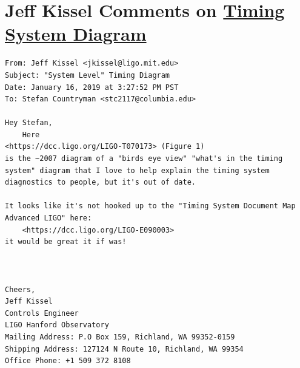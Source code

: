 \documentclass{article}
\begin{document}
\clearpage
\section{Jeff Kissel Comments on \href{https://dcc.ligo.org/LIGO-D1500201}{Timing System Diagram}}
\label{sec:timing-system-diagram-email}
\lstset{language=}
\begin{lstlisting}
From: Jeff Kissel <jkissel@ligo.mit.edu>
Subject: "System Level" Timing Diagram
Date: January 16, 2019 at 3:27:52 PM PST
To: Stefan Countryman <stc2117@columbia.edu>

Hey Stefan,
	Here
<https://dcc.ligo.org/LIGO-T070173> (Figure 1)
is the ~2007 diagram of a "birds eye view" "what's in the timing system" diagram that I love to help explain the timing system diagnostics to people, but it's out of date.

It looks like it's not hooked up to the "Timing System Document Map Advanced LIGO" here:
	<https://dcc.ligo.org/LIGO-E090003>
it would be great it if was!



Cheers,
Jeff Kissel
Controls Engineer
LIGO Hanford Observatory
Mailing Address: P.O Box 159, Richland, WA 99352-0159
Shipping Address: 127124 N Route 10, Richland, WA 99354
Office Phone: +1 509 372 8108
\end{lstlisting}

\clearpage
\end{document}
